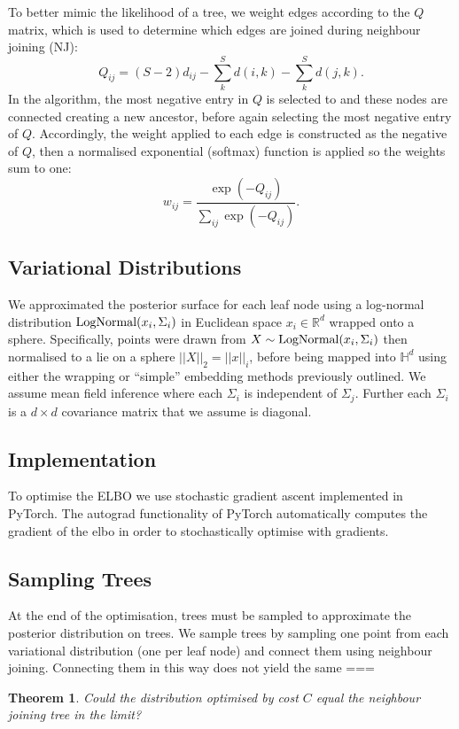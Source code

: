 \documentclass[11pt, twocolumn]{article}
\newtheorem{theorem}{Theorem}
\newcommand{\be}{\begin{equation*}}
\newcommand{\ee}{\end{equation*}}
\begin{document}
To better mimic the likelihood of a tree, we weight edges according to the $Q$ matrix, which is used to determine which edges are joined during neighbour joining (NJ): 
\be
Q_{ij} = (S-2)d_{ij} - \sum_{k}^{S}d(i, k) - \sum_{k}^{S}d(j, k).
\ee
In the algorithm, the most negative entry in $Q$ is selected to and these nodes are connected creating a new ancestor, before again selecting the most negative entry of $Q$.
Accordingly, the weight applied to each edge is constructed as the negative of $Q$, then a normalised exponential (softmax) function is applied so the weights sum to one:
\be
w_{ij} = \frac{\exp(-Q_{ij})}{\sum_{ij} \exp(-Q_{ij})}.
\ee

\subsection{Variational Distributions}
We approximated the posterior surface for each leaf node using a log-normal distribution $\textnormal{LogNormal}(x_{i}, \Sigma_{i})$ in Euclidean space $x_{i} \in \mathbb{R}^{d}$ wrapped onto a sphere.
Specifically, points were drawn from $X \sim \textnormal{LogNormal}(x_{i}, \Sigma_{i})$ then normalised to a lie on a sphere $||X||_{2} = ||x||_{i}$, before being mapped into $\mathbb{H}^{d}$ using either the wrapping or ``simple'' embedding methods previously outlined.
We assume mean field inference where each $\Sigma_{i}$ is independent of $\Sigma_{j}$.
Further each $\Sigma_{i}$ is a $d \times d$ covariance matrix that we assume is diagonal.

\subsection{Implementation}
To optimise the ELBO we use stochastic gradient ascent implemented in PyTorch.
The autograd functionality of PyTorch automatically computes the gradient of the elbo in order to stochastically optimise with gradients.

\subsection{Sampling Trees}
At the end of the optimisation, trees must be sampled to approximate the posterior distribution on trees.
We sample trees by sampling one point from each variational distribution (one per leaf node) and connect them using neighbour joining.
Connecting them in this way does not yield the same ===

\begin{theorem}
Could the distribution optimised by cost $C$ equal the neighbour joining tree in the limit?
\end{theorem}
\end{document}
